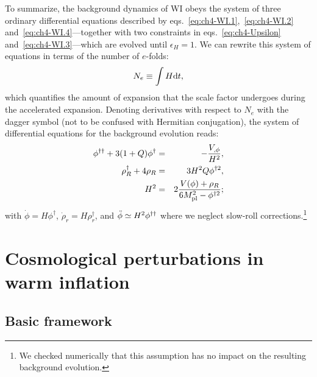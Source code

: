 To summarize, the background dynamics of WI obeys the system of three ordinary differential
equations described by eqs.~\eqref{eq:ch4-WI.1},~\eqref{eq:ch4-WI.2} and~\eqref{eq:ch4-WI.4}—together with two constraints in eqs.~\eqref{eq:ch4-Upsilon} and~\eqref{eq:ch4-WI.3}—which are evolved until $\epsilon_H=1$. We can rewrite this system of equations in terms of the number of $e$-folds:
\begin{equation}
    N_e\equiv\int H {\rm d}t, \label{eq:ch4-defNe}
\end{equation}
which quantifies the amount of expansion that the scale factor undergoes during the accelerated expansion.
Denoting derivatives
with respect to $N_e$ with the dagger symbol (not to be confused with Hermitian conjugation), the system of differential equations for the background evolution reads:
\begin{eqnarray}
    \phi^{\dagger\dagger}+3(1+Q)\phi^{\dagger} &=& -\frac{V_{,\phi}}{H^2}, \label{eq:ch4-BG1}\\
    \rho_R^{\dagger}+4\rho_R &=& 3H^2Q\phi^{\dagger 2},  \label{eq:ch4-BG2}\\
    H^2 &=& 2\frac{V(\phi)+\rho_R}{6M_{\rm{pl}}^2-\phi^{\dagger 2}}; \label{eq:ch4-BG3}
\end{eqnarray}
with $\dot{\phi} = H\phi^{\dagger}$, $\dot{\rho}_r= H\rho_r^{\dagger}$, and $\Ddot{\phi} \simeq H^2\phi^{\dagger\dagger}$ where we neglect slow-roll corrections.\footnote{We checked numerically that this assumption has no impact on the resulting background evolution.}

\section{Cosmological perturbations in warm inflation}
\label{sec:ch4-perturbations}

\subsection{Basic framework \label{sec:ch4-perturbations_1}}

